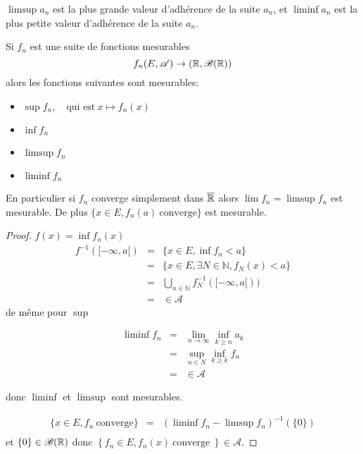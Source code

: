 \begin{remarque}
	$\limsup a_n$ est la plus grande valeur d'adhérence de la suite $a_n$, et
	$\liminf a_n$ est la plus petite valeur d'adhérence de la suite $a_n$.
\end{remarque}

\begin{prop}
	Si $f_n$ est une suite de fonctions mesurables
	$$f_n (E,\mathscr{A}) \rightarrow (\mathbb{R},\mathscr{B}(\mathbb{R}))$$
	alors les fonctions suivantes sont mesurables:
	\begin{itemize}
		\item $\sup f_n, \quad \text{qui est} \ x\mapsto f_n(x) $
		\item $\inf f_n$
		\item $\limsup f_n$
		\item $\liminf f_n$
	\end{itemize}
	En particulier si $f_n$ converge simplement dans $\overline{\mathbb{R}}$ alors
	$\lim f_n = \limsup f_n$ est mesurable. De plus $\{ x \in E, f_n(a) \ \text{converge}\}$ est mesurable.
\end{prop}

\begin{proof} %
	$f(x) = \inf f_n (x)$
	\begin{eqnarray*}
		f^{-1}([-\infty, a[) &=& \{x \in E, \inf f_n < a\} \\
		&=& \{x \in E, \exists N \in \mathbb{N}, f_N (x) < a \}\\
		&=& \bigcup\limits_{n\in \mathbb{N}}f_N^{-1}([-\infty, a[))\\
		&=& \in \mathscr{A}
	\end{eqnarray*}
	de même pour $\sup$

	\begin{eqnarray*}
		\liminf f_n &=& \lim\limits_{n \to \infty}\inf\limits_{k \geq n } a_k\\
		&=& \sup _{n\in N} \inf_{k \geq k} f_n\\
		&=& \in \mathscr{A}
	\end{eqnarray*}

	donc $\liminf$ et $\limsup$ sont mesurables.

	\begin{eqnarray*}
		\{x \in E, f_n \  \text{converge} \}  &=& (\liminf f_n - \limsup f_n)^{-1}(\{0\})\\
	\end{eqnarray*}
	et $\{ 0 \} \in \mathscr{B}(\mathbb{R})$ donc $\left\{ f_n \in E, f_n(x) \ \text{converge} \ \right\} \in \mathscr{A}$.
\end{proof}
